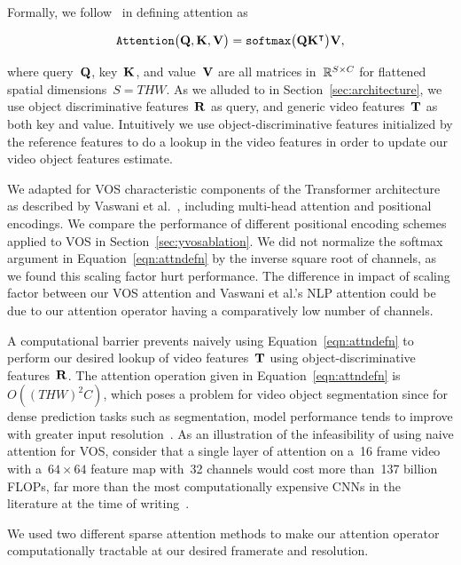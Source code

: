 Formally, we follow~\cite{vaswani2017attention} in defining attention as

\begin{equation}
\mathtt{Attention}\big(\mathbf{Q}{}, \mathbf{K}{}, \mathbf{V}{}\big) = \mathtt{softmax}{}\big(\mathbf{Q}{}\mathbf{K}{}^\intercal\big)\mathbf{V}{},
\label{eqn:attndefn}
\end{equation}

where query~$\mathbf{Q}{}$, key~$\mathbf{K}{}$, and value~$\mathbf{V}{}$
are all matrices in~$\mathbb{R}{}^{S\times C}$ for flattened spatial dimensions~$S =
THW$.
As we alluded to in Section~\ref{sec:architecture}, we use object
discriminative features~$\mathbf{R}{}$ as query, and generic video
features~$\mathbf{T}{}$ as both key and value.
Intuitively we use object-discriminative features initialized by the reference
features to do a lookup in the video features in order to update our video
object features estimate.

We adapted for VOS characteristic components of the Transformer architecture as
described by Vaswani et al.~\cite{vaswani2017attention}, including multi-head
attention and positional encodings.
We compare the performance of different positional encoding schemes applied to
VOS in Section~\ref{sec:yvosablation}.
We did not normalize the softmax argument in Equation~\ref{eqn:attndefn} by the
inverse square root of channels, as we found this scaling factor hurt
performance.
The difference in impact of scaling factor between our VOS attention and
Vaswani et al.'s NLP attention could be due to our attention operator having a
comparatively low number of channels.

A computational barrier prevents naively using Equation~\ref{eqn:attndefn} to
perform our desired lookup of video features~$\mathbf{T}{}$ using
object-discriminative features~$\mathbf{R}{}$.
The attention operation given in Equation~\ref{eqn:attndefn} is~$O({(THW)}^2
C)$, which poses a problem for video object segmentation since for dense
prediction tasks such as segmentation, model performance tends to improve with
greater input resolution~\cite{zhao2017icnet}.
As an illustration of the infeasibility of using naive attention for VOS,
consider that a single layer of attention on a~\num{16} frame video with
a~$64\times 64$ feature map with~\num{32} channels would cost more
than~\num{137} billion FLOPs, far more than the most computationally expensive
CNNs in the literature at the time of writing~\cite{tan2019efficientnet}.

We used two different sparse attention methods to make our attention operator
computationally tractable at our desired framerate and resolution.


